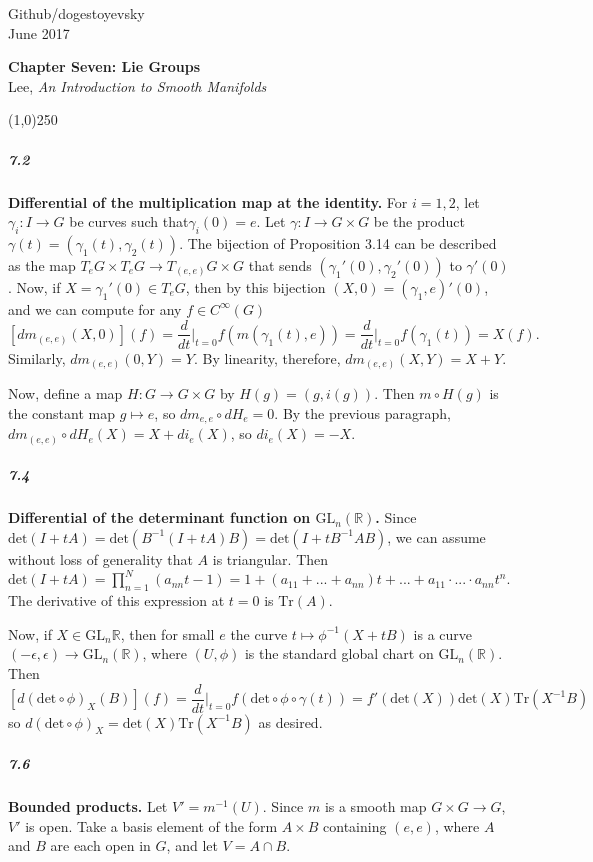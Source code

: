 \documentclass[10pt,letter]{article}
\begin{document}
\noindent Github/dogestoyevsky \\
June 2017
\begin{center}
\textbf{Chapter Seven: Lie Groups}\\ Lee, \textit{An Introduction to Smooth Manifolds}

\line(1,0){250}
\end{center}

\subparagraph{7.2} {\bf Differential of the multiplication map at the identity.} For $i = 1,2$, let $\gamma_i: I \rightarrow G$ be curves such that$\gamma_i(0) = e$. Let $\gamma: I \rightarrow G \times G$ be the product $\gamma(t) = (\gamma_1(t),\gamma_2(t))$. The bijection of Proposition 3.14 can be described as the map $T_eG \times T_eG \rightarrow T_{(e,e)}G\times G$ that sends $(\gamma_1'(0),\gamma_2'(0))$ to $\gamma'(0)$. Now, if $X = \gamma_1'(0) \in T_eG$, then by this bijection $(X,0) = (\gamma_1,e)'(0)$, and we can compute for any $f \in C^{\infty}(G)$
\[ 
[dm_{(e,e)}(X,0)](f) = \frac{d}{dt} \bigg \vert_{t = 0} f(m(\gamma_1(t),e))
 = \frac{d}{dt} \bigg \vert_{t = 0} f(\gamma_1(t)) = X(f).
\]
Similarly, $dm_{(e,e)}(0,Y) = Y$. By linearity, therefore, $dm_{(e,e)}(X,Y) = X+Y$. 

Now, define a map $H: G \rightarrow G \times G$ by $H(g) = (g,i(g))$. Then $m \circ H(g)$ is the constant map $g \mapsto e$, so $dm_{e,e} \circ dH_e = 0$. By the previous paragraph, $dm_{(e,e)} \circ dH_e(X) = X + di_e(X)$, so $di_e(X) = -X$. 

\subparagraph{7.4} {\bf Differential of the determinant function on $\text{GL}_n(\mathbb{R})$.} Since $\text{det}(I+tA) = \text{det}(B^{-1}(I+tA)B)=\text{det}(I+tB^{-1}AB)$, we can assume without loss of generality that $A$ is triangular. Then $\text{det}(I+tA) = \prod_{n=1}^N (a_{nn}t-1) = 1 + (a_{11} + ... + a_{nn}) t + ... + a_{11} \cdot ... \cdot a_{nn} t^n$. The derivative of this expression at $t = 0$ is $\text{Tr}(A)$.  

Now, if $X \in \text{GL}_{n}{\mathbb{R}}$, then for small $e$ the curve $t \mapsto \phi^{-1}(X+tB)$ is a curve $(-\epsilon,\epsilon) \rightarrow \text{GL}_n(\mathbb{R})$, where $(U,\phi)$ is the standard global chart on $\text{GL}_n(\mathbb{R})$. Then 
\[ [d(\text{det} \circ \phi)_X (B)](f) = \frac{d}{dt} \bigg \vert_{t = 0} f(\text{det} \circ \phi \circ \gamma(t)) = f'(\text{det}(X)) \text{det}(X) \text{Tr}(X^{-1}B)
\]
so $d(\text{det} \circ \phi)_X = \text{det}(X) \text{Tr}(X^{-1}B)$ as desired. 

\subparagraph{7.6} {\bf Bounded products.} Let $V' = m^{-1}(U)$. Since $m$ is a smooth map $G \times G \rightarrow G$, $V'$ is open. Take a basis element of the form $A \times B$ containing $(e,e)$, where $A$ and $B$ are each open in $G$, and let $V = A \cap B$. 
\end{document}
